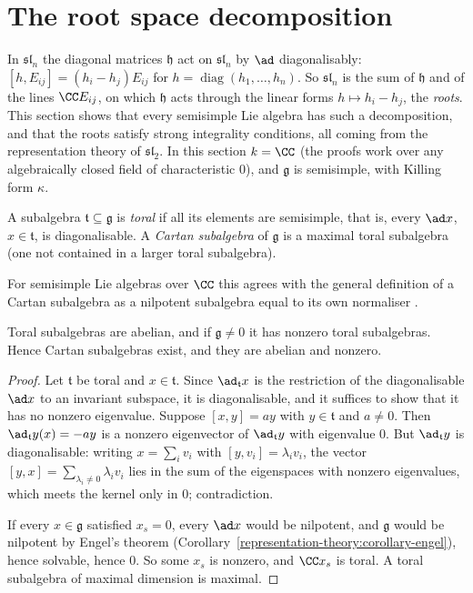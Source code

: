 \section{The root space decomposition}\label{representation-theory:section-roots}

In $\mathfrak{sl}_n$ the diagonal matrices $\mathfrak{h}$ act on $\mathfrak{sl}_n$ by $\ad$ diagonalisably: $[h, E_{ij}] = (h_i - h_j)E_{ij}$ for $h = \operatorname{diag}(h_1, \ldots,
h_n)$. So $\mathfrak{sl}_n$ is the sum of $\mathfrak{h}$ and of the lines $\CC E_{ij}$, on which $\mathfrak{h}$ acts through the linear forms $h \mapsto h_i - h_j$, the
\emph{roots}. This section shows that every semisimple Lie algebra has such a decomposition, and that the roots satisfy strong integrality conditions, all coming from the
representation theory of $\mathfrak{sl}_2$. In this section $k = \CC$ (the proofs work over any algebraically closed field of characteristic $0$), and $\mathfrak{g}$ is semisimple,
with Killing form $\kappa$.

\begin{definition}\label{representation-theory:definition-toral}
A subalgebra $\mathfrak{t} \subseteq \mathfrak{g}$ is \emph{toral} if all its elements are semisimple, that is, every $\ad x$, $x \in \mathfrak{t}$, is diagonalisable. A
\emph{Cartan subalgebra} of $\mathfrak{g}$ is a maximal toral subalgebra (one not contained in a larger toral subalgebra).
\end{definition}

For semisimple Lie algebras over $\CC$ this agrees with the general definition of a Cartan subalgebra as a nilpotent subalgebra equal to its own normaliser
\cite[Section 15]{humphreys-lie}.

\begin{lemma}\label{representation-theory:lemma-toral}
Toral subalgebras are abelian, and if $\mathfrak{g} \neq 0$ it has nonzero toral subalgebras. Hence Cartan subalgebras exist, and they are abelian and nonzero.
\end{lemma}

\begin{proof}
Let $\mathfrak{t}$ be toral and $x \in \mathfrak{t}$. Since $\ad_{\mathfrak{t}}x$ is the restriction of the diagonalisable $\ad x$ to an invariant subspace, it is diagonalisable,
and it suffices to show that it has no nonzero eigenvalue. Suppose $[x, y] = ay$ with $y \in \mathfrak{t}$ and $a \neq 0$. Then $\ad_{\mathfrak{t}}y(x) = -ay$ is a nonzero
eigenvector of $\ad_{\mathfrak{t}}y$ with eigenvalue $0$. But $\ad_{\mathfrak{t}}y$ is diagonalisable: writing $x = \sum_iv_i$ with $[y, v_i] = \lambda_iv_i$, the vector
$[y, x] = \sum_{\lambda_i \neq 0}\lambda_iv_i$ lies in the sum of the eigenspaces with nonzero eigenvalues, which meets the kernel only in $0$; contradiction.

If every $x \in \mathfrak{g}$ satisfied $x_s = 0$, every $\ad x$ would be nilpotent, and $\mathfrak{g}$ would be nilpotent by Engel's theorem
(Corollary~\ref{representation-theory:corollary-engel}), hence solvable, hence $0$. So some $x_s$ is nonzero, and $\CC x_s$ is toral. A toral subalgebra of maximal dimension is maximal.
\end{proof}


